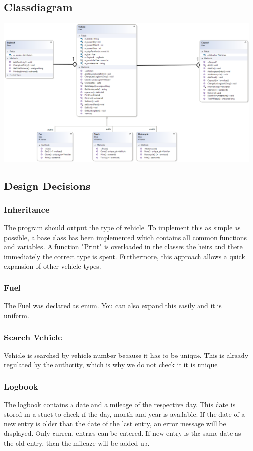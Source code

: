 \subsection{Classdiagram}
\includegraphics{Carpool_Class_Diagram.png}

\subsection{Design Decisions}
\subsubsection{Inheritance}
The program should output the type of vehicle. To implement this as simple as possible, a base class has been implemented which contains all common functions and variables. A function "Print" is overloaded in the classes the heirs and there immediately the correct type is spent.
Furthermore, this approach allows a quick expansion of other vehicle types.

\subsubsection{Fuel}
The Fuel was declared as enum. You can also expand this easily and it is uniform.

\subsubsection{Search Vehicle}
Vehicle is searched by vehicle number because it has to be unique. This is already regulated by the authority, which is why we do not check it it is unique.

\subsubsection{Logbook}
The logbook contains a date and a mileage of the respective day. This date is stored in a stuct to check if the day, month and year is available.
If the date of a new entry is older than the date of the last entry, an error message will be displayed. Only current entries can be entered. If new entry is the same date as the old entry, then the mileage will be added up.

